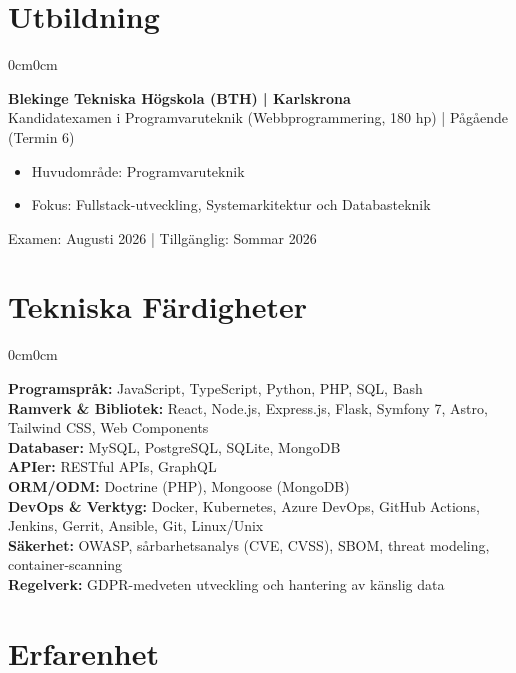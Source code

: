 \documentclass[10pt, letterpaper]{article}
\newenvironment{highlights}{
    \begin{itemize}[topsep=0.10cm, parsep=0.10cm, partopsep=0pt, itemsep=0pt, leftmargin=10pt]
}{
    \end{itemize}
}
\newenvironment{onecolentry}{
    \begin{adjustwidth}{0cm}{0cm}
}{
    \end{adjustwidth}
}
\begin{document}
    \section{Utbildning}
    \begin{onecolentry}
        \textbf{Blekinge Tekniska Högskola (BTH) | Karlskrona} \\
        Kandidatexamen i Programvaruteknik (Webbprogrammering, 180 hp) | Pågående (Termin 6)
        \begin{highlights}
            \item Huvudområde: Programvaruteknik
            \item Fokus: Fullstack-utveckling, Systemarkitektur och Databasteknik
        \end{highlights}
        Examen: Augusti 2026 | Tillgänglig: Sommar 2026
    \end{onecolentry}

    \section{Tekniska Färdigheter}
    \begin{onecolentry}
        \textbf{Programspråk:} JavaScript, TypeScript, Python, PHP, SQL, Bash \\[0.15cm]
        \textbf{Ramverk \& Bibliotek:} React, Node.js, Express.js, Flask, Symfony 7, Astro, Tailwind CSS, Web Components \\[0.15cm]
        \textbf{Databaser:} MySQL, PostgreSQL, SQLite, MongoDB \\[0.15cm]
        \textbf{APIer:} RESTful APIs, GraphQL \\[0.15cm]
        \textbf{ORM/ODM:} Doctrine (PHP), Mongoose (MongoDB) \\[0.15cm]
        \textbf{DevOps \& Verktyg:} Docker, Kubernetes, Azure DevOps, GitHub Actions, Jenkins, Gerrit, Ansible, Git, Linux/Unix \\[0.15cm]
        \textbf{Säkerhet:} OWASP, sårbarhetsanalys (CVE, CVSS), SBOM, threat modeling, container-scanning \\[0.15cm]
        \textbf{Regelverk:} GDPR-medveten utveckling och hantering av känslig data
    \end{onecolentry}

    \section{Erfarenhet}
\end{document}
